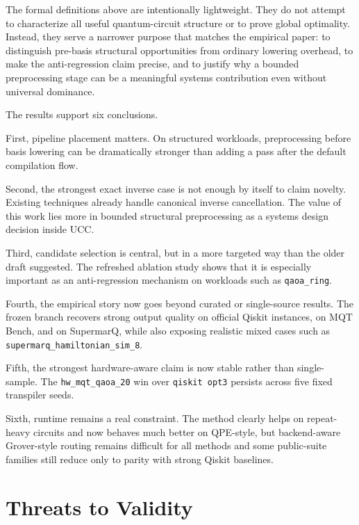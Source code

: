 \documentclass[11pt]{article}
\begin{document}
The formal definitions above are intentionally lightweight. They do not attempt to characterize all useful quantum-circuit structure or to prove global optimality. Instead, they serve a narrower purpose that matches the empirical paper: to distinguish pre-basis structural opportunities from ordinary lowering overhead, to make the anti-regression claim precise, and to justify why a bounded preprocessing stage can be a meaningful systems contribution even without universal dominance.

The results support six conclusions.

First, pipeline placement matters. On structured workloads, preprocessing before basis lowering can be dramatically stronger than adding a pass after the default compilation flow.

Second, the strongest exact inverse case is not enough by itself to claim novelty. Existing techniques already handle canonical inverse cancellation. The value of this work lies more in bounded structural preprocessing as a systems design decision inside UCC.

Third, candidate selection is central, but in a more targeted way than the older draft suggested. The refreshed ablation study shows that it is especially important as an anti-regression mechanism on workloads such as \texttt{qaoa\_ring}.

Fourth, the empirical story now goes beyond curated or single-source results. The frozen branch recovers strong output quality on official Qiskit instances, on MQT Bench, and on SupermarQ, while also exposing realistic mixed cases such as \texttt{supermarq\_hamiltonian\_sim\_8}.

Fifth, the strongest hardware-aware claim is now stable rather than single-sample. The \texttt{hw\_mqt\_qaoa\_20} win over \texttt{qiskit opt3} persists across five fixed transpiler seeds.

Sixth, runtime remains a real constraint. The method clearly helps on repeat-heavy circuits and now behaves much better on QPE-style, but backend-aware Grover-style routing remains difficult for all methods and some public-suite families still reduce only to parity with strong Qiskit baselines.

\section{Threats to Validity}
\end{document}
